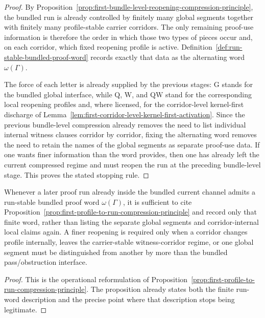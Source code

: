 \begin{proof}
By Proposition~\ref{prop:first-bundle-level-reopening-compression-principle}, the bundled run is already controlled by finitely many global segments together with finitely many profile-stable carrier corridors. The only remaining proof-use information is therefore the order in which those two types of pieces occur and, on each corridor, which fixed reopening profile is active. Definition~\ref{def:run-stable-bundled-proof-word} records exactly that data as the alternating word $\omega(\Gamma)$.

The force of each letter is already supplied by the previous stages: $\mathrm{G}$ stands for the bundled global interface, while $\mathrm{Q}$, $\mathrm{W}$, and $\mathrm{QW}$ stand for the corresponding local reopening profiles and, where licensed, for the corridor-level kernel-first discharge of Lemma~\ref{lem:first-corridor-level-kernel-first-activation}. Since the previous bundle-level compression already removes the need to list individual internal witness clauses corridor by corridor, fixing the alternating word removes the need to retain the names of the global segments as separate proof-use data. If one wants finer information than the word provides, then one has already left the current compressed regime and must reopen the run at the preceding bundle-level stage. This proves the stated stopping rule.
\end{proof}

\begin{corollary}
\label{cor:use-rule-for-the-first-profile-to-run-compression-principle}
Whenever a later proof run already inside the bundled current channel admits a run-stable bundled proof word $\omega(\Gamma)$, it is sufficient to cite Proposition~\ref{prop:first-profile-to-run-compression-principle} and record only that finite word, rather than listing the separate global segments and corridor-internal local claims again. A finer reopening is required only when a corridor changes profile internally, leaves the carrier-stable witness-corridor regime, or one global segment must be distinguished from another by more than the bundled pass/obstruction interface.
\end{corollary}

\begin{proof}
This is the operational reformulation of Proposition~\ref{prop:first-profile-to-run-compression-principle}. The proposition already states both the finite run-word description and the precise point where that description stops being legitimate.
\end{proof}


